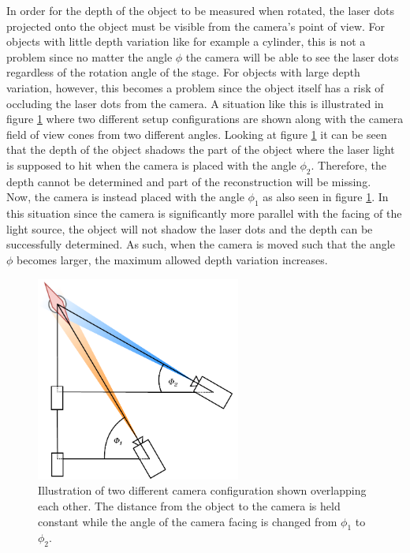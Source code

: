 In order for the depth of the object to be measured when rotated, the laser dots projected onto the object must be visible from the camera's point of view. For objects with little depth variation like for example a cylinder, this is not a problem since no matter the angle $\phi$ the camera will be able to see the laser dots regardless of the rotation angle of the stage. For objects with large depth variation, however, this becomes a problem since the object itself has a risk of occluding the laser dots from the camera. A situation like this is illustrated in figure \ref{fig:occlusion} where two different setup configurations are shown along with the camera field of view cones from two different angles. Looking at figure \ref{fig:occlusion} it can be seen that the depth of the object shadows the part of the object where the laser light is supposed to hit when the camera is placed with the angle $\phi_{2}$. Therefore, the depth cannot be determined and part of the reconstruction will be missing.\\

Now, the camera is instead placed with the angle $\phi_{1}$ as also seen in figure \ref{fig:occlusion}. In this situation since the camera is significantly more parallel with the facing of the light source, the object will not shadow the laser dots and the depth can be successfully determined. As such, when the camera is moved such that the angle $\phi$ becomes larger, the maximum allowed depth variation increases. 
\begin{figure}[h]
    \centering
    \includegraphics[width=0.6\textwidth]{figures/reconstruction/occlusion.pdf}
    \caption{Illustration of two different camera configuration shown overlapping each other. The distance from the object to the camera is held constant while the angle of the camera facing is changed from $\phi_{1}$ to $\phi_{2}$.}
    \label{fig:occlusion}
\end{figure}
 
